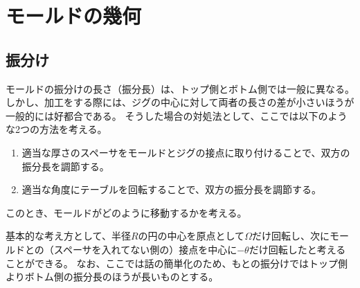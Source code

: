 \part{モールドの幾何}



\chapter{振分け}
モールドの振分けの長さ（振分長）は、トップ側とボトム側では一般に異なる。
しかし、加工をする際には、ジグの中心に対して両者の長さの差が小さいほうが一般的には好都合である。
そうした場合の対処法として、ここでは以下のような2つの方法を考える。
\begin{enumerate}
\item
適当な厚さのスペーサをモールドとジグの接点に取り付けることで、双方の振分長を調節する。
\item
適当な角度にテーブルを回転することで、双方の振分長を調節する。
\end{enumerate}
このとき、モールドがどのように移動するかを考える。

基本的な考え方として、半径$R$の円の中心を原点として$\Omega$だけ回転し、次にモールドとの（スペーサを入れてない側の）接点を中心に$-\theta$だけ回転したと考えることができる。
なお、ここでは話の簡単化のため、もとの振分けではトップ側よりボトム側の振分長のほうが長いものとする。




